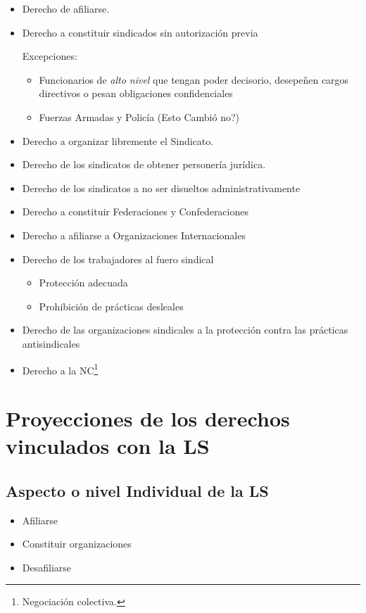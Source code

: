 \documentclass[spanish,12pt,a4paper,titlepage]{report}
\begin{document}
\begin{itemize}


\item Derecho de afiliarse.
\item Derecho a constituir sindicados sin autorización previa

	Excepciones:
	\begin{itemize}
	\item Funcionarios de \textit{alto nivel} que tengan poder decisorio, desepeñen cargos directivos o pesan obligaciones confidenciales
	\item Fuerzas Armadas y Policía (Esto Cambió no?)	
	\end{itemize}
	
\item Derecho a organizar libremente el Sindicato.
\item Derecho de los sindicatos de obtener personería jurídica.
\item Derecho de los sindicatos a no ser disueltos administrativamente
\item Derecho a constituir Federaciones y Confederaciones
\item Derecho a afiliarse a Organizaciones Internacionales
\item Derecho de los trabajadores al fuero sindical
	\begin{itemize}
	\item Protección adecuada
	\item Prohibición de prácticas desleales
	\end{itemize}
\item Derecho de las organizaciones sindicales a la protección contra las prácticas antisindicales
\item Derecho a la NC\footnote{Negociación colectiva.}
\end{itemize}

\section{Proyecciones de los derechos vinculados con la LS}

\subsection{Aspecto o nivel Individual de la LS}

\begin{itemize}
\item Afiliarse
\item Constituir organizaciones
\item Desafiliarse
\end{itemize}
\end{document}
